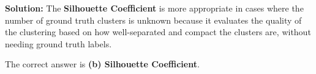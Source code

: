 \documentclass{article}
\begin{document}
\begin{enumerate}
    \textbf{Solution:} \newline
    The \textbf{Silhouette Coefficient} is more appropriate in cases where the number of ground truth clusters is unknown because it evaluates the quality of the clustering based on how well-separated and compact the clusters are, without needing ground truth labels.

    The correct answer is \textbf{(b) Silhouette Coefficient}.
\end{enumerate}
\end{document}
